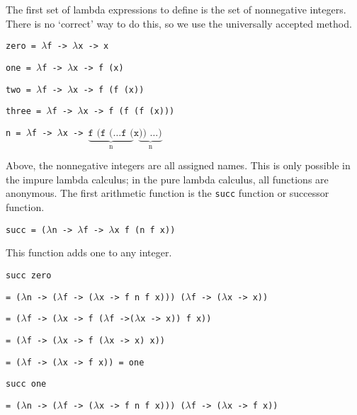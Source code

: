 \documentclass[11pt]{article}
\begin{document}
The first set of lambda expressions to define is the set of nonnegative integers. There is no `correct' way to do this, so we use the universally accepted method.

\hspace{2cm}\texttt{zero = $\lambda$f -> $\lambda$x -> x}

\hspace{2cm}\texttt{one = $\lambda$f -> $\lambda$x -> f (x)}

\hspace{2cm}\texttt{two = $\lambda$f -> $\lambda$x -> f (f (x))}

\hspace{2cm}\texttt{three = $\lambda$f -> $\lambda$x -> f (f (f (x)))}

\hspace{2cm}\texttt{n = $\lambda$f -> $\lambda$x -> $\underbrace{\texttt{f (f (\ldots f (}}_\textrm{n} \texttt{x} \underbrace{\texttt{)) \ldots)}}_\textrm{n}$} 

Above, the nonnegative integers are all assigned names. This is only possible in the impure lambda calculus; in the pure lambda calculus, all functions are anonymous. The first arithmetic function is the \texttt{succ} function or successor function. 

\hspace{2cm}\texttt{succ = ($\lambda$n -> $\lambda$f -> $\lambda$x f (n f x))}

This function adds one to any integer. 

\hspace{2cm}\texttt{succ zero}

\hspace{2.5cm}\texttt{= ($\lambda$n -> ($\lambda$f -> ($\lambda$x -> f n f x))) ($\lambda$f -> ($\lambda$x -> x))}

\hspace{2.5cm}\texttt{= ($\lambda$f  -> ($\lambda$x -> f ($\lambda$f ->($\lambda$x -> x)) f x))}

\hspace{2.5cm}\texttt{= ($\lambda$f -> ($\lambda$x -> f ($\lambda$x -> x) x))}

\hspace{2.5cm}\texttt{= ($\lambda$f -> ($\lambda$x -> f x)) = one}
\medskip

\hspace{2cm}\texttt{succ one}

\hspace{2.5cm}\texttt{= ($\lambda$n -> ($\lambda$f -> ($\lambda$x -> f n f x))) ($\lambda$f -> ($\lambda$x -> f x))}
\end{document}
